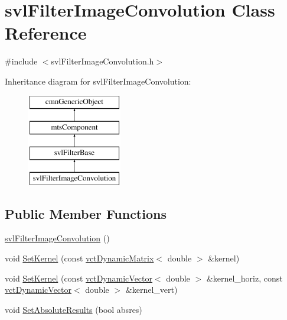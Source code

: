 \hypertarget{classsvl_filter_image_convolution}{}\section{svl\+Filter\+Image\+Convolution Class Reference}
\label{classsvl_filter_image_convolution}


{\ttfamily \#include $<$svl\+Filter\+Image\+Convolution.\+h$>$}

Inheritance diagram for svl\+Filter\+Image\+Convolution\+:\begin{figure}[H]
\begin{center}
\leavevmode
\includegraphics[height=4.000000cm]{d7/d7c/classsvl_filter_image_convolution}
\end{center}
\end{figure}
\subsection*{Public Member Functions}
\begin{DoxyCompactItemize}
\item 
\hyperlink{classsvl_filter_image_convolution_aa28936888f31ce76409131883e685743}{svl\+Filter\+Image\+Convolution} ()
\item 
void \hyperlink{classsvl_filter_image_convolution_a67099f3b3b21330c766b023969c748b1}{Set\+Kernel} (const \hyperlink{classvct_dynamic_matrix}{vct\+Dynamic\+Matrix}$<$ double $>$ \&kernel)
\item 
void \hyperlink{classsvl_filter_image_convolution_a0a446098856d4f30acec5d7060355be0}{Set\+Kernel} (const \hyperlink{classvct_dynamic_vector}{vct\+Dynamic\+Vector}$<$ double $>$ \&kernel\+\_\+horiz, const \hyperlink{classvct_dynamic_vector}{vct\+Dynamic\+Vector}$<$ double $>$ \&kernel\+\_\+vert)
\item 
void \hyperlink{classsvl_filter_image_convolution_a150272f9c18e68bf1ee00094715f8c36}{Set\+Absolute\+Results} (bool absres)
\end{DoxyCompactItemize}
